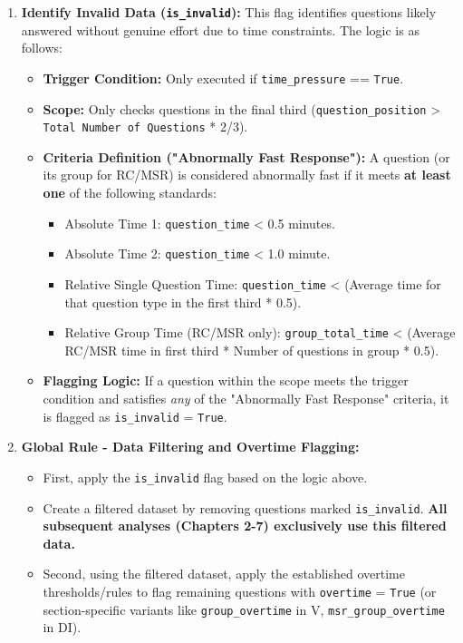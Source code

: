 \documentclass{article}
\begin{document}
\begin{enumerate}
\begin{itemize}
    \end{itemize}
    \item \textbf{Identify Invalid Data (\texttt{is\_invalid}):} This flag identifies questions likely answered without genuine effort due to time constraints. The logic is as follows:
        \begin{itemize}
            \item \textbf{Trigger Condition:} Only executed if \texttt{time\_pressure} == \texttt{True}.
            \item \textbf{Scope:} Only checks questions in the final third (\texttt{question\_position} > \texttt{Total Number of Questions} * 2/3).
            \item \textbf{Criteria Definition ("Abnormally Fast Response"):} A question (or its group for RC/MSR) is considered abnormally fast if it meets \textbf{at least one} of the following standards:
                \begin{itemize}
                    \item Absolute Time 1: \texttt{question\_time} < 0.5 minutes.
                    \item Absolute Time 2: \texttt{question\_time} < 1.0 minute.
                    \item Relative Single Question Time: \texttt{question\_time} < (Average time for that question type in the first third * 0.5).
                    \item Relative Group Time (RC/MSR only): \texttt{group\_total\_time} < (Average RC/MSR time in first third * Number of questions in group * 0.5).
                \end{itemize}
            \item \textbf{Flagging Logic:} If a question within the scope meets the trigger condition and satisfies \textit{any} of the "Abnormally Fast Response" criteria, it is flagged as \texttt{is\_invalid} = \texttt{True}.
        \end{itemize}
    \item \textbf{Global Rule - Data Filtering and Overtime Flagging:}
    \begin{itemize}
        \item First, apply the \texttt{is\_invalid} flag based on the logic above.
        \item Create a filtered dataset by removing questions marked \texttt{is\_invalid}. \textbf{All subsequent analyses (Chapters 2-7) exclusively use this filtered data.}
        \item Second, using the filtered dataset, apply the established overtime thresholds/rules to flag remaining questions with \texttt{overtime} = \texttt{True} (or section-specific variants like \texttt{group\_overtime} in V, \texttt{msr\_group\_overtime} in DI).
    \end{itemize}
\end{enumerate}
\end{document}
